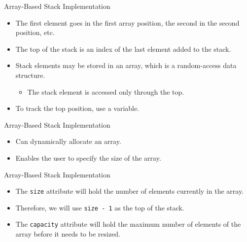 \documentclass[14pt,aspectratio=1610]{beamer}
\begin{document}

\begin{frame}{Array-Based Stack Implementation}
\begin{itemize}
\item
  The first element goes in the first array position, the second in the second position, etc.
\item
  The top of the stack is an index of the last element added to the stack.
\item
  Stack elements may be stored in an array, which is a random-access data structure.
  \begin{itemize}
  \item
    The stack element is accessed only through the top.
  \end{itemize}
\item
  To track the top position, use a variable.
\end{itemize}

\end{frame}


\begin{frame}{Array-Based Stack Implementation}
\begin{itemize}
\item
  Can dynamically allocate an array.
\item
  Enables the user to specify the size of the array.
\end{itemize}
\end{frame}

\begin{frame}{Array-Based Stack Implementation}
\begin{itemize}
\item
  The \texttt{size} attribute will hold the number of elements currently in the array.
\item
  Therefore, we will use \texttt{size - 1} as the top of the stack.
\item
  The \texttt{capacity} attribute will hold the maximum number of elements of the array before it needs to be resized.
\end{itemize}
\end{frame}
\end{document}
